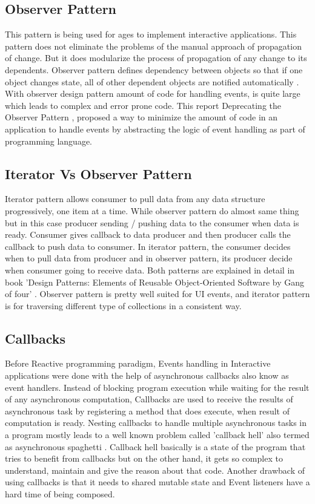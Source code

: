 \subsection{Observer Pattern}
This pattern is being used for ages to implement interactive applications. This pattern does not eliminate the problems of the manual approach of propagation of change. But it does modularize the process of propagation of any change to its dependents. Observer pattern defines dependency between objects so that if one object changes state, all of other dependent objects are notified automatically \citep{Gamma:1995:DPE:186897}. With observer design pattern amount of code for handling events, is quite large which leads to complex and error prone code. This report Deprecating the Observer Pattern \citep{EPFL-REPORT-176887}, proposed a way to minimize the amount of code in an application to handle events by abstracting the logic of event handling as part of programming language.

\subsection{Iterator Vs Observer Pattern}
Iterator pattern allows consumer to pull data from any data structure progressively, one item at a time. While observer pattern do almost same thing but in this case producer sending / pushing data to the consumer when data is ready. Consumer gives callback to data producer and then producer calls the callback to push data to consumer. In iterator pattern, the consumer decides when to pull data from producer and in observer pattern, its producer decide when consumer going to receive data. Both patterns are explained in detail in book 'Design Patterns: Elements of Reusable Object-Oriented Software by Gang of four' \citep{Gamma:1995:DPE:186897}. Observer pattern is pretty well suited for UI events, and iterator pattern is for traversing different type of collections in a consistent way.

\subsection{Callbacks}
Before Reactive programming paradigm, Events handling in Interactive applications were done with the help of asynchronous callbacks also know as event handlers. 
Instead of blocking program execution while waiting for the result of any asynchronous computation, Callbacks are used to receive the results of asynchronous task by registering a method that does execute, when result of computation is ready. Nesting callbacks to handle multiple asynchronous tasks in a program mostly leads to a well known problem called 'callback hell' \citep{Kambona:2013:ERP:2489798.2489802} also termed as asynchronous spaghetti \citep{SMLI-TR-2007-166}. Callback hell basically is a state of the program that tries to benefit from callbacks but on the other hand, it gets so complex to understand, maintain and give the reason about that code. Another drawback of using callbacks is that it needs to shared mutable state and Event listeners have a hard time of being composed.


